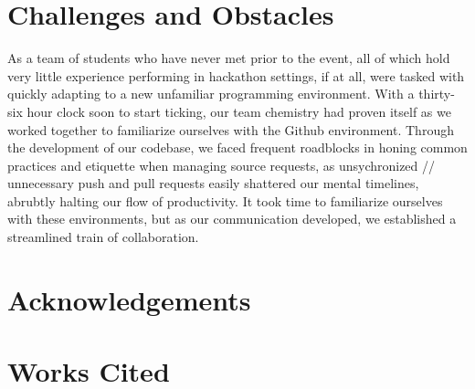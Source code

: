 \documentclass{article}
\begin{document}
\section*{Challenges and Obstacles}

As a team of students who have never met prior to the event, all of which hold very little experience performing
in hackathon settings, if at all, were tasked with quickly adapting to a new unfamiliar programming environment.
With a thirty-six hour clock soon to start ticking, our team chemistry had proven itself as we worked together
to familiarize ourselves with the Github environment. Through the development of our codebase, we faced frequent
roadblocks in honing common practices and etiquette when managing source requests, as unsychronized // unnecessary
push and pull requests easily shattered our mental timelines, abrubtly halting our flow of productivity. It took
time to familiarize ourselves with these environments, but as our communication developed, we established
a streamlined train of collaboration.

\section*{Acknowledgements}

\newpage
\section*{Works Cited}
\end{document}
